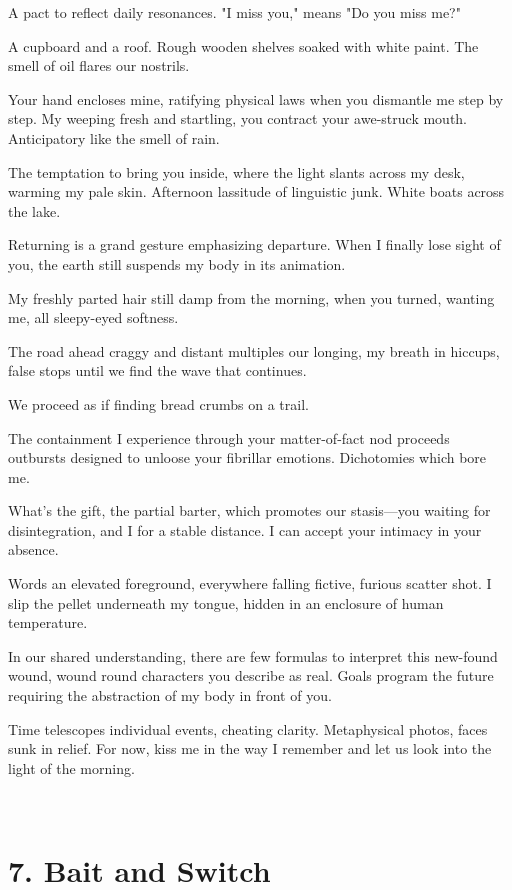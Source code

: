 \documentclass[
]{memoir}
\begin{document}
A pact to reflect daily resonances. "I miss you," means "Do you miss
me?"

A cupboard and a roof. Rough wooden shelves soaked with white paint. The
smell of oil flares our nostrils.

Your hand encloses mine, ratifying physical laws when you dismantle me
step by step. My weeping fresh and startling, you contract your
awe-struck mouth. Anticipatory like the smell of rain.

The temptation to bring you inside, where the light slants across my
desk, warming my pale skin. Afternoon lassitude of linguistic junk.
White boats across the lake.

Returning is a grand gesture emphasizing departure. When I finally lose
sight of you, the earth still suspends my body in its animation.

My freshly parted hair still damp from the morning, when you turned,
wanting me, all sleepy-eyed softness.

The road ahead craggy and distant multiples our longing, my breath in
hiccups, false stops until we find the wave that continues.

We proceed as if finding bread crumbs on a trail.

The containment I experience through your matter-of-fact nod proceeds
outbursts designed to unloose your fibrillar emotions. Dichotomies which
bore me.

What's the gift, the partial barter, which promotes our stasis---you
waiting for disintegration, and I for a stable distance. I can accept
your intimacy in your absence.

Words an elevated foreground, everywhere falling fictive, furious
scatter shot. I slip the pellet underneath my tongue, hidden in an
enclosure of human temperature.

In our shared understanding, there are few formulas to interpret this
new-found wound, wound round characters you describe as real. Goals
program the future requiring the abstraction of my body in front of you.

Time telescopes individual events, cheating clarity. Metaphysical
photos, faces sunk in relief. For now, kiss me in the way I remember and
let us look into the light of the morning.

~

\hypertarget{bait-and-switch}{%
\section*{7. Bait and Switch}\label{bait-and-switch}}
\end{document}
